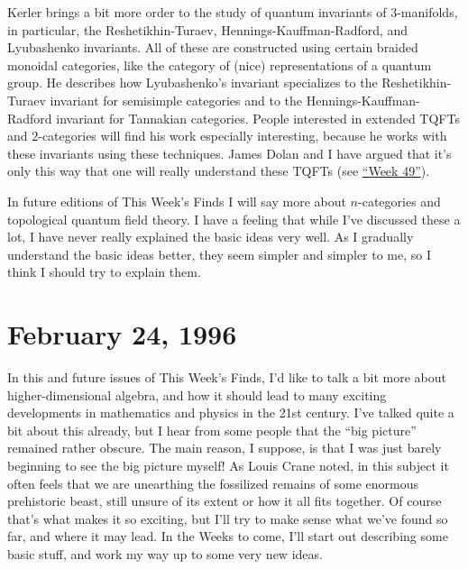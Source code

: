 \documentclass{article}
\def\tightlist{}
\renewcommand{\texttt}[1]{%
  \begingroup
  \ttfamily
  \begingroup\lccode`~=`/\lowercase{\endgroup\def~}{/\discretionary{}{}{}}%
  \begingroup\lccode`~=`[\lowercase{\endgroup\def~}{[\discretionary{}{}{}}%
  \begingroup\lccode`~=`.\lowercase{\endgroup\def~}{.\discretionary{}{}{}}%
  \catcode`/=\active\catcode`[=\active\catcode`.=\active
  \scantokens{#1\noexpand}%
  \endgroup
}
\begin{document}

Kerler brings a bit more order to the study of quantum invariants of
3-manifolds, in particular, the Reshetikhin-Turaev,
Hennings-Kauffman-Radford, and Lyubashenko invariants. All of these are
constructed using certain braided monoidal categories, like the category
of (nice) representations of a quantum group. He describes how
Lyubashenko's invariant specializes to the Reshetikhin-Turaev invariant
for semisimple categories and to the Hennings-Kauffman-Radford invariant
for Tannakian categories. People interested in extended TQFTs and
\(2\)-categories will find his work especially interesting, because he
works with these invariants using these techniques. James Dolan and I
have argued that it's only this way that one will really understand
these TQFTs (see \protect\hyperlink{week49}{``Week 49''}).

In future editions of This Week's Finds I will say more about
\(n\)-categories and topological quantum field theory. I have a feeling
that while I've discussed these a lot, I have never really explained the
basic ideas very well. As I gradually understand the basic ideas better,
they seem simpler and simpler to me, so I think I should try to explain
them.



\hypertarget{week73}{%
\section{February 24, 1996}\label{week73}}

In this and future issues of This Week's Finds, I'd like to talk a bit
more about higher-dimensional algebra, and how it should lead to many
exciting developments in mathematics and physics in the 21st century.
I've talked quite a bit about this already, but I hear from some people
that the ``big picture'' remained rather obscure. The main reason, I
suppose, is that I was just barely beginning to see the big picture
myself! As Louis Crane noted, in this subject it often feels that we are
unearthing the fossilized remains of some enormous prehistoric beast,
still unsure of its extent or how it all fits together. Of course that's
what makes it so exciting, but I'll try to make sense what we've found
so far, and where it may lead. In the Weeks to come, I'll start out
describing some basic stuff, and work my way up to some very new ideas.
\end{document}
